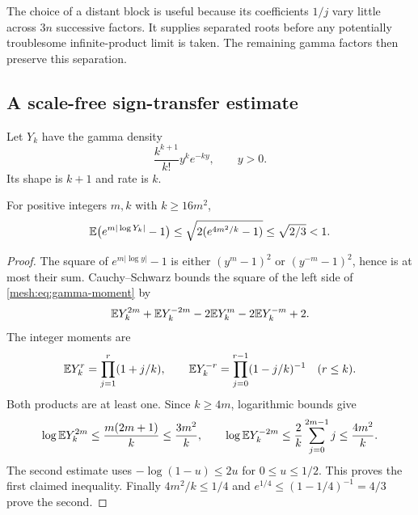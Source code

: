The choice of a distant block is useful because its coefficients
$1/j$ vary little across $3n$ successive factors. It supplies separated
roots before any potentially troublesome infinite-product limit is
taken. The remaining gamma factors then preserve this separation.

\subsection{A scale-free sign-transfer estimate}

Let $Y_k$ have the gamma density
\begin{equation}\label{mesh:eq:gamma-density}
 \frac{k^{k+1}}{k!}y^k e^{-ky},\qquad y>0.
\end{equation}
Its shape is $k+1$ and rate is $k$.

\begin{lemma}
\label{mesh:lem:gamma-moment}
For positive integers $m,k$ with $k\geq16m^2$,
\begin{equation}\label{mesh:eq:gamma-moment}
 \mathbb E\bigl(e^{m|\log Y_k|}-1\bigr)
 \leq\sqrt{2(e^{4m^2/k}-1)}\leq\sqrt{2/3}<1.
\end{equation}
\end{lemma}
\begin{proof}
The square of $e^{m|\log y|}-1$ is either $(y^m-1)^2$ or
$(y^{-m}-1)^2$, hence is at most their sum. Cauchy--Schwarz bounds
the square of the left side of \eqref{mesh:eq:gamma-moment} by
\[
 \mathbb E Y_k^{2m}+\mathbb E Y_k^{-2m}-2\mathbb E Y_k^m-2\mathbb E Y_k^{-m}+2.
\]
The integer moments are
\[
 \mathbb E Y_k^r=\prod_{j=1}^r(1+j/k),\qquad
 \mathbb E Y_k^{-r}=\prod_{j=0}^{r-1}(1-j/k)^{-1}\quad(r\leq k).
\]
Both products are at least one. Since $k\geq4m$, logarithmic
bounds give
\[
 \log\mathbb E Y_k^{2m}\leq\frac{m(2m+1)}k\leq\frac{3m^2}k,
 \qquad
 \log\mathbb E Y_k^{-2m}\leq\frac2k\sum_{j=0}^{2m-1}j
                    \leq\frac{4m^2}k.
\]
The second estimate uses $-\log(1-u)\leq2u$ for $0\leq u\leq1/2$.
This proves the first claimed inequality. Finally $4m^2/k\leq1/4$
and $e^{1/4}\leq(1-1/4)^{-1}=4/3$ prove the second.
\end{proof}

